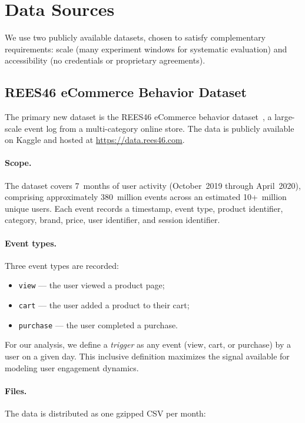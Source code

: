 \section{Data Sources}
\label{sec:data_sources}

We use two publicly available datasets, chosen to satisfy
complementary requirements: scale (many experiment windows for
systematic evaluation) and accessibility (no credentials or
proprietary agreements).

\subsection{REES46 eCommerce Behavior Dataset}
\label{subsec:rees46_source}

The primary new dataset is the REES46 eCommerce behavior
dataset~\citep{rees46dataset}, a large-scale event log from
a multi-category online store.
The data is publicly available on Kaggle and hosted at
\url{https://data.rees46.com}.

\paragraph{Scope.}
The dataset covers 7~months of user activity
(October~2019 through April~2020), comprising approximately
380~million events across an estimated 10+~million unique users.
Each event records a timestamp, event type, product identifier,
category, brand, price, user identifier, and session identifier.

\paragraph{Event types.}
Three event types are recorded:
\begin{itemize}[leftmargin=*]
  \item \texttt{view} --- the user viewed a product page;
  \item \texttt{cart} --- the user added a product to their cart;
  \item \texttt{purchase} --- the user completed a purchase.
\end{itemize}
For our analysis, we define a \emph{trigger} as any event
(view, cart, or purchase) by a user on a given day.
This inclusive definition maximizes the signal available for
modeling user engagement dynamics.

\paragraph{Files.}
The data is distributed as one gzipped CSV per month:

